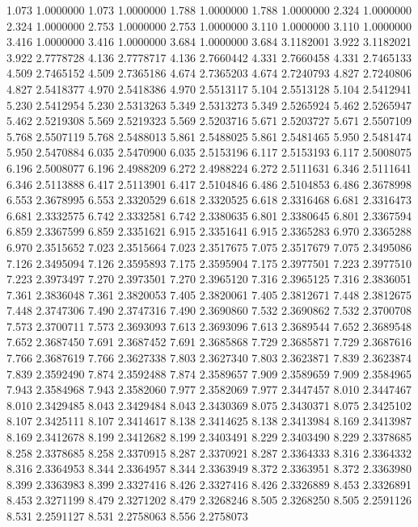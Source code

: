 1.073 1.0000000
1.073 1.0000000
1.788 1.0000000
1.788 1.0000000
2.324 1.0000000
2.324 1.0000000
2.753 1.0000000
2.753 1.0000000
3.110 1.0000000
3.110 1.0000000
3.416 1.0000000
3.416 1.0000000
3.684 1.0000000
3.684 3.1182001
3.922 3.1182021
3.922 2.7778728
4.136 2.7778717
4.136 2.7660442
4.331 2.7660458
4.331 2.7465133
4.509 2.7465152
4.509 2.7365186
4.674 2.7365203
4.674 2.7240793
4.827 2.7240806
4.827 2.5418377
4.970 2.5418386
4.970 2.5513117
5.104 2.5513128
5.104 2.5412941
5.230 2.5412954
5.230 2.5313263
5.349 2.5313273
5.349 2.5265924
5.462 2.5265947
5.462 2.5219308
5.569 2.5219323
5.569 2.5203716
5.671 2.5203727
5.671 2.5507109
5.768 2.5507119
5.768 2.5488013
5.861 2.5488025
5.861 2.5481465
5.950 2.5481474
5.950 2.5470884
6.035 2.5470900
6.035 2.5153196
6.117 2.5153193
6.117 2.5008075
6.196 2.5008077
6.196 2.4988209
6.272 2.4988224
6.272 2.5111631
6.346 2.5111641
6.346 2.5113888
6.417 2.5113901
6.417 2.5104846
6.486 2.5104853
6.486 2.3678998
6.553 2.3678995
6.553 2.3320529
6.618 2.3320525
6.618 2.3316468
6.681 2.3316473
6.681 2.3332575
6.742 2.3332581
6.742 2.3380635
6.801 2.3380645
6.801 2.3367594
6.859 2.3367599
6.859 2.3351621
6.915 2.3351641
6.915 2.3365283
6.970 2.3365288
6.970 2.3515652
7.023 2.3515664
7.023 2.3517675
7.075 2.3517679
7.075 2.3495086
7.126 2.3495094
7.126 2.3595893
7.175 2.3595904
7.175 2.3977501
7.223 2.3977510
7.223 2.3973497
7.270 2.3973501
7.270 2.3965120
7.316 2.3965125
7.316 2.3836051
7.361 2.3836048
7.361 2.3820053
7.405 2.3820061
7.405 2.3812671
7.448 2.3812675
7.448 2.3747306
7.490 2.3747316
7.490 2.3690860
7.532 2.3690862
7.532 2.3700708
7.573 2.3700711
7.573 2.3693093
7.613 2.3693096
7.613 2.3689544
7.652 2.3689548
7.652 2.3687450
7.691 2.3687452
7.691 2.3685868
7.729 2.3685871
7.729 2.3687616
7.766 2.3687619
7.766 2.3627338
7.803 2.3627340
7.803 2.3623871
7.839 2.3623874
7.839 2.3592490
7.874 2.3592488
7.874 2.3589657
7.909 2.3589659
7.909 2.3584965
7.943 2.3584968
7.943 2.3582060
7.977 2.3582069
7.977 2.3447457
8.010 2.3447467
8.010 2.3429485
8.043 2.3429484
8.043 2.3430369
8.075 2.3430371
8.075 2.3425102
8.107 2.3425111
8.107 2.3414617
8.138 2.3414625
8.138 2.3413984
8.169 2.3413987
8.169 2.3412678
8.199 2.3412682
8.199 2.3403491
8.229 2.3403490
8.229 2.3378685
8.258 2.3378685
8.258 2.3370915
8.287 2.3370921
8.287 2.3364333
8.316 2.3364332
8.316 2.3364953
8.344 2.3364957
8.344 2.3363949
8.372 2.3363951
8.372 2.3363980
8.399 2.3363983
8.399 2.3327416
8.426 2.3327416
8.426 2.3326889
8.453 2.3326891
8.453 2.3271199
8.479 2.3271202
8.479 2.3268246
8.505 2.3268250
8.505 2.2591126
8.531 2.2591127
8.531 2.2758063
8.556 2.2758073

